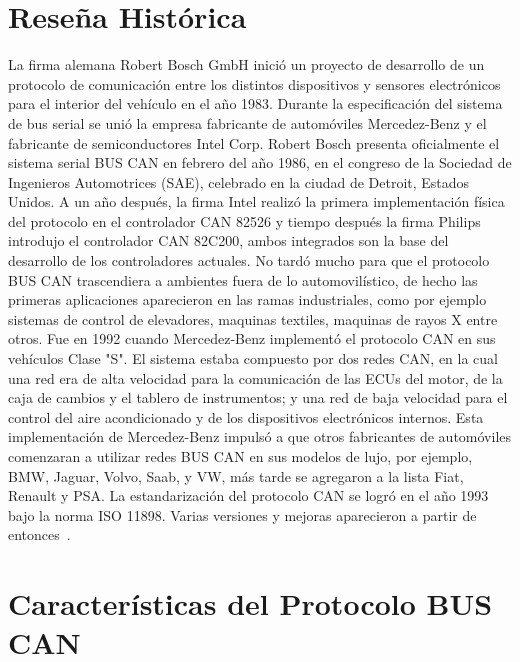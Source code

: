 \section {Reseña Histórica}
La firma alemana Robert Bosch GmbH inició un proyecto de desarrollo de un protocolo de comunicación entre los distintos dispositivos y sensores  electrónicos para el interior del vehículo en el año 1983. 
Durante la especificación del sistema de bus serial se unió la empresa fabricante de automóviles Mercedez-Benz y el fabricante de semiconductores Intel Corp. 
Robert Bosch presenta oficialmente el sistema serial BUS CAN en febrero del año 1986, en el congreso de la Sociedad de Ingenieros Automotrices (SAE), celebrado en la ciudad de Detroit, Estados Unidos.
A un año después, la firma Intel realizó la primera implementación física del protocolo en el controlador CAN 82526 y tiempo después la firma Philips introdujo el controlador CAN 82C200, ambos integrados son la base del desarrollo de los controladores actuales.
No tardó mucho para que el protocolo BUS CAN trascendiera a ambientes fuera de lo automovilístico, de hecho las primeras aplicaciones aparecieron en las ramas industriales, como por ejemplo sistemas de control de elevadores, maquinas textiles, maquinas de rayos X entre otros.
Fue en 1992 cuando Mercedez-Benz implementó el protocolo CAN en sus vehículos Clase "S". El sistema estaba compuesto por dos redes CAN, en la cual una red era de alta velocidad para la comunicación de las ECUs del motor, de la caja de cambios y el tablero de instrumentos; y una red de baja velocidad para el control del aire acondicionado y de los dispositivos electrónicos internos.  
Esta implementación de Mercedez-Benz impulsó a que otros fabricantes de automóviles comenzaran a utilizar redes BUS CAN en sus modelos de lujo, por ejemplo, BMW, Jaguar, Volvo, Saab, y VW, más tarde se agregaron a la lista Fiat, Renault y PSA. 
La estandarización del protocolo CAN se logró en el año 1993 bajo la norma ISO 11898. 
Varias versiones y mejoras aparecieron a partir de entonces~\cite{DSEEPC}.



\section {Características del Protocolo BUS CAN}

